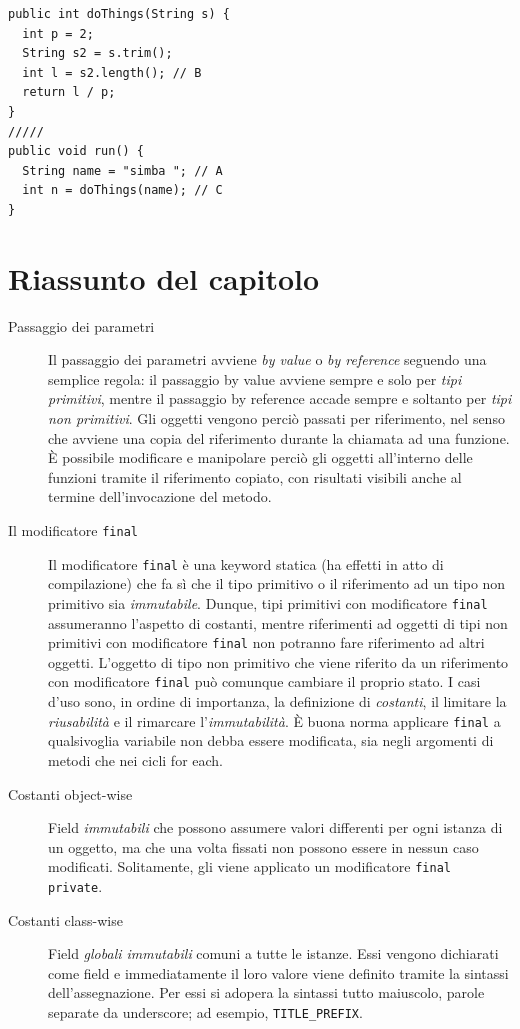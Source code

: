 \documentclass[\fontsizeclass,twocolumn]{\classname}
\theoremstyle{definition}
\theoremstyle{definition}
\begin{document}
\begin{lstlisting}
public int doThings(String s) {
  int p = 2;
  String s2 = s.trim();
  int l = s2.length(); // B
  return l / p;
}
/////
public void run() {
  String name = "simba "; // A
  int n = doThings(name); // C
}
\end{lstlisting}

\section{Riassunto del capitolo}

\begin{description}
    \item[Passaggio dei parametri] Il passaggio dei parametri avviene \emph{by value} o \emph{by reference} seguendo una semplice regola: il passaggio by value avviene sempre e solo per \emph{tipi primitivi}, mentre il passaggio by reference accade sempre e soltanto per \emph{tipi non primitivi}. Gli oggetti vengono perciò passati per riferimento, nel senso che avviene una copia del riferimento durante la chiamata ad una funzione. È possibile modificare e manipolare perciò gli oggetti all'interno delle funzioni tramite il riferimento copiato, con risultati visibili anche al termine dell'invocazione del metodo.
    \item[Il modificatore \texttt{final}] Il modificatore \texttt{final} è una keyword statica (ha effetti in atto di compilazione) che fa sì che il tipo primitivo o il riferimento ad un tipo non primitivo sia \emph{immutabile}. Dunque, tipi primitivi con modificatore \texttt{final} assumeranno l'aspetto di costanti, mentre riferimenti ad oggetti di tipi non primitivi con modificatore \texttt{final} non potranno fare riferimento ad altri oggetti. L'oggetto di tipo non primitivo che viene riferito da un riferimento con modificatore \texttt{final} può comunque cambiare il proprio stato. I casi d'uso sono, in ordine di importanza, la definizione di \emph{costanti}, il limitare la \emph{riusabilità} e il rimarcare l'\emph{immutabilità}. È buona norma applicare \texttt{final} a qualsivoglia variabile non debba essere modificata, sia negli argomenti di metodi che nei cicli for each.
    \item[Costanti object-wise] Field \emph{immutabili} che possono assumere valori differenti per ogni istanza di un oggetto, ma che una volta fissati non possono essere in nessun caso modificati. Solitamente, gli viene applicato un modificatore \texttt{final private}.
    \item[Costanti class-wise] Field \emph{globali immutabili} comuni a tutte le istanze. Essi vengono dichiarati come field e immediatamente il loro valore viene definito tramite la sintassi dell'assegnazione. Per essi si adopera la sintassi tutto maiuscolo, parole separate da underscore; ad esempio, \texttt{TITLE\_PREFIX}.

\end{description}
\end{document}
